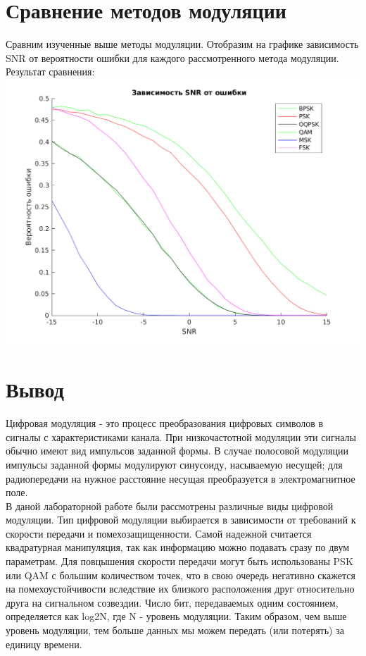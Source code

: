 \documentclass[a4paper]{article}
\begin{document}
\section{Сравнение методов модуляции}
Сравним изученные выше методы модуляции. Отобразим на графике зависимость SNR от вероятности ошибки для каждого рассмотренного метода модуляции.
Результат сравнения:\\
\includegraphics[scale=0.7]{lab6/figures/figure_12.png}\\
\section{Вывод}
Цифровая модуляция - это процесс преобразования цифровых символов в сигналы с характеристиками канала. При низкочастотной модуляции эти сигналы обычно имеют вид импульсов заданной формы. В случае полосовой модуляции импульсы заданной формы модулируют синусоиду, насываемую несущей; для радиопередачи на нужное расстояние
несущая преобразуется в электромагнитное поле.\\

В даной лабораторной работе были рассмотрены различные виды цифровой модуляции. Тип цифровой модуляции выбирается в зависимости от требований к скорости передачи и помехозащищенности. Самой надежной считается квадратурная манипуляция, так как информацию можно подавать сразу по двум параметрам. Для повцышения скорости передачи могут быть использованы PSK или QAM с большим количеством точек, что в свою очередь негативно скажется на помехоустойчивости вследствие их близкого расположения друг относительно друга на сигнальном созвездии. Число бит, передаваемых одним состоянием, определяется как log2N, где N - уровень модуляции. Таким образом, чем выше уровень модуляции, тем больше данных мы можем передать (или потерять) за единицу времени.
\end{document}
